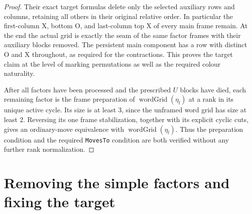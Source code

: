 \documentclass[11pt,a4paper]{article}
\theoremstyle{remark}
\begin{document}
\begin{proof}
Their exact target formulas delete only the selected auxiliary rows
and columns, retaining all others in their original relative order.
In particular the first-column X, bottom O, and last-column top X of
every main frame remain.  At the end the actual grid is exactly the
seam of the same factor frames with their auxiliary blocks removed.
The persistent main component has a row with distinct O and X
throughout, as required for the contractions.  This proves the target
claim at the level of marking permutations as well as the required
colour naturality.

After all factors have been processed and the prescribed $U$ blocks
have died, each remaining factor is the frame preparation of
$\operatorname{wordGrid}(\eta_l)$ at a rank in its unique active
cycle.  Its size is at least $3$, since the unframed word grid has size
at least $2$.  Reversing its one frame stabilization, together with
its explicit cyclic cuts, gives an ordinary-move equivalence with
$\operatorname{wordGrid}(\eta_l)$.  Thus the preparation condition and
the required \texttt{MovesTo} condition are both verified without any
further rank normalization.


\end{proof}


\section{Removing the simple factors and fixing the target}
\end{document}
